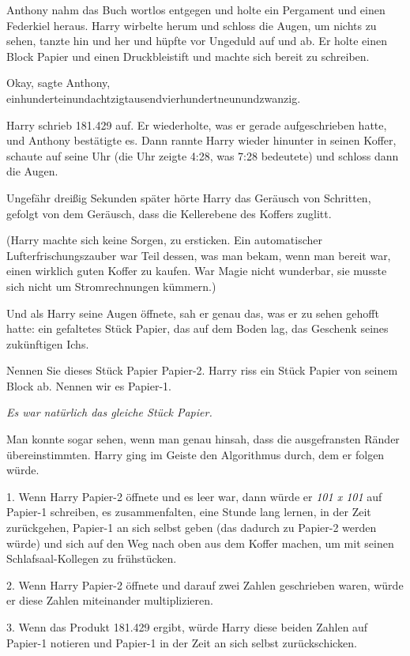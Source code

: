 Anthony nahm das Buch wortlos entgegen und holte ein Pergament und einen
Federkiel heraus. Harry wirbelte herum und schloss die Augen, um nichts zu
sehen, tanzte hin und her und hüpfte vor Ungeduld auf und ab. Er holte einen
Block Papier und einen Druckbleistift und machte sich bereit zu schreiben.

\glqq{}Okay\grqq{}, sagte Anthony, \glqq{}
einhunderteinundachtzigtausendvierhundertneunundzwanzig.\grqq{}

Harry schrieb 181.429 auf. Er wiederholte, was er gerade aufgeschrieben hatte,
und Anthony bestätigte es. Dann rannte Harry wieder hinunter in seinen Koffer,
schaute auf seine Uhr (die Uhr zeigte 4:28, was 7:28 bedeutete) und schloss dann
die Augen.

Ungefähr dreißig Sekunden später hörte Harry das Geräusch von Schritten, gefolgt
von dem Geräusch, dass die Kellerebene des Koffers zuglitt.

(Harry machte sich keine Sorgen, zu ersticken. Ein automatischer
Lufterfrischungszauber war Teil dessen, was man bekam, wenn man bereit war,
einen wirklich guten Koffer zu kaufen. War Magie nicht wunderbar, sie musste
sich nicht um Stromrechnungen kümmern.)

Und als Harry seine Augen öffnete, sah er genau das, was er zu sehen gehofft
hatte: ein gefaltetes Stück Papier, das auf dem Boden lag, das Geschenk seines
zukünftigen Ichs.

Nennen Sie dieses Stück Papier \glqq{}Papier-2\grqq{}. Harry riss ein Stück
Papier von seinem Block ab. Nennen wir es \glqq{}Papier-1\grqq{}.

\emph{Es war natürlich das gleiche Stück Papier.}

Man konnte sogar sehen, wenn man genau hinsah, dass die ausgefransten Ränder
übereinstimmten. Harry ging im Geiste den Algorithmus durch, dem er folgen
würde.

1. Wenn Harry Papier-2 öffnete und es leer war, dann würde er \emph{\glqq{}101 x
101\grqq{}} auf Papier-1 schreiben, es zusammenfalten, eine Stunde lang lernen,
in der Zeit zurückgehen, Papier-1 an sich selbst geben (das dadurch zu Papier-2
werden würde) und sich auf den Weg nach oben aus dem Koffer machen, um mit
seinen Schlafsaal-Kollegen zu frühstücken.

2. Wenn Harry Papier-2 öffnete und darauf zwei Zahlen geschrieben waren, würde
er diese Zahlen miteinander multiplizieren.

3. Wenn das Produkt 181.429 ergibt, würde Harry diese beiden Zahlen auf Papier-1
notieren und Papier-1 in der Zeit an sich selbst zurückschicken.

